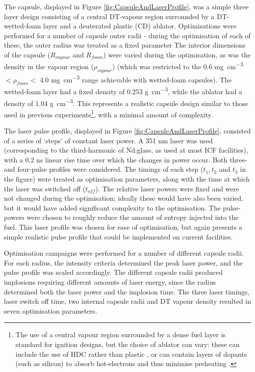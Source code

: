 The capsule, displayed in Figure \ref{fig:CapsuleAndLaserProfile}, was a simple three layer design consisting of a central DT-vapour region surrounded by a DT-wetted-foam layer and a deuterated plastic (CD) ablator. Optimisations were performed for a number of capsule outer radii - during the optimisation of each of these, the outer radius was treated as a fixed parameter The interior dimensions of the capsule ($R_{vapour}$ and $R_{foam}$) were varied during the optimisation, as was the density in the vapour region ($\rho_{vapour}$) (which was restricted to the 0.6 \unit{\milli\gram\per\centi\meter\cubed} $< \rho_{foam} <$ 4.0 \unit{\milli\gram\per\centi\meter\cubed} range achievable with wetted-foam capsules). The wetted-foam layer had a fixed density of 0.253 \unit{\gram\per\centi\meter\cubed}, while the ablator had a density of 1.04 \unit{\gram\per\centi\meter\cubed}. This represents a realistic capsule design similar to those used in previous experiments\footnote{ The use of a central vapour region surrounded by a dense fuel layer is standard for ignition designs, but the choice of ablator can vary: these can include the use of HDC rather than plastic \cite{Mackinnon2014}, or can contain layers of dopants (such as silicon) to absorb hot-electrons and thus minimise preheating \cite{Solodov2022}.}, with a minimal amount of complexity. 

The laser pulse profile, displayed in Figure \ref{fig:CapsuleAndLaserProfile}, consisted of a series of `steps' of constant laser power. A 351 \unit{\nano\meter} laser was used (corresponding to the third-harmonic of Nd:glass, as used at most ICF facilities), with a 0.2 \unit{\nano\second} linear rise time over which the changes in power occur. Both three- and four-pulse profiles were considered. The timings of each step ($t_1, t_2$ and $t_3$ in the figure) were treated as optimisation parameters, along with the time at which the laser was switched off ($t_{off}$). The relative laser powers were fixed and were not changed during the optimisation; ideally these would have also been varied, but it would have added significant complexity to the optimisation. The pulse-powers were chosen to roughly reduce the amount of entropy injected into the fuel. This laser profile was chosen for ease of optimisation, but again presents a simple realistic pulse profile that could be implemented on current facilities.

Optimisation campaigns were performed for a number of different capsule radii. For each radius, the intensity criteria determined the peak laser power, and the pulse profile was scaled accordingly. The different capsule radii produced implosions requiring different amounts of laser energy, since the radius determined both the laser power and the implosion time. The three laser timings, laser switch off time, two internal capsule radii and DT vapour density resulted in seven optimisation parameters.

